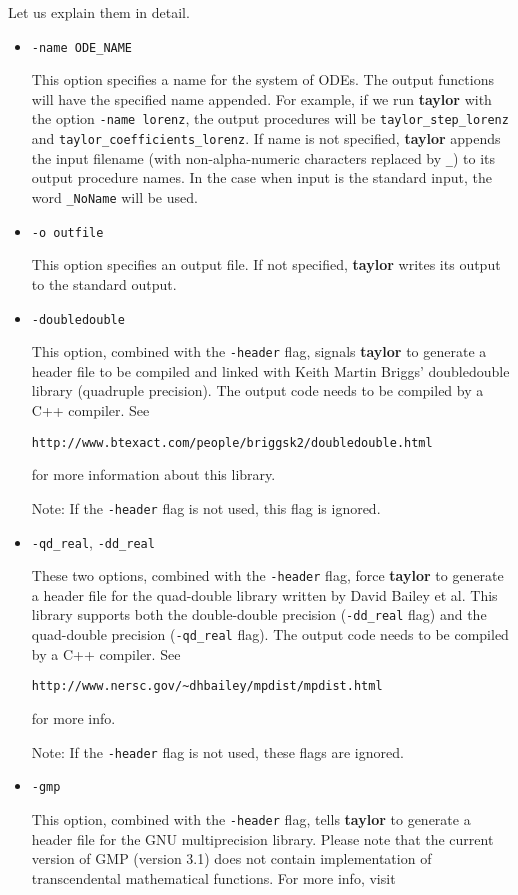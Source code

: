 \documentclass{article}
\begin{document}
Let us explain them in detail.

\begin{itemize}
\item{ \verb+-name ODE_NAME+ 

This option specifies a
name for the system of ODEs. The output functions will have
the specified name appended. For example, if we run
{\bf taylor} with the option \verb+-name lorenz+, the output
procedures will be
\verb+taylor_step_lorenz+ and
\verb+taylor_coefficients_lorenz+.
If name is not specified, {\bf taylor} appends the input
filename (with non-alpha-numeric characters replaced by
\verb+_+) to its output procedure names. In the case
when input is the standard input, the word \verb+_NoName+
will be used.}
\item{ \verb+-o outfile+ 

This option specifies an output
file. If not specified, {\bf taylor} writes its output
to the standard output.}
\item{\verb+-doubledouble+

This option, combined with the {\tt -header} flag, signals {\bf
taylor} to generate a header file to be compiled and linked with Keith
Martin Briggs' doubledouble library (quadruple precision).
The output code needs to be compiled by a C++ compiler.
See

\noindent   
\verb-http://www.btexact.com/people/briggsk2/doubledouble.html-

\noindent
for more information about this library.

Note: If the {\tt -header} flag is not used, this flag is
ignored.}
\item {{\tt -qd\_real}, {\tt -dd\_real}

These two options, combined with the {\tt -header} flag, force
{\bf taylor} to generate a header file for the
quad-double library written by
David Bailey et al. This library supports
both the double-double precision ({\tt -dd\_real} flag) and the
quad-double precision ({\tt -qd\_real} flag).
The output code needs to be compiled by a C++ compiler.
See

\verb+http://www.nersc.gov/~dhbailey/mpdist/mpdist.html+

for more info.

Note: If the {\tt -header} flag is not used, these flags are
ignored.}

\item{\verb+-gmp+ 

This option, combined with the {\tt -header} flag, tells 
{\bf taylor} to generate a header file for
the GNU multiprecision library. Please note that
the current version of GMP (version 3.1) does not
contain implementation of transcendental
mathematical functions. For more info, visit

}
\end{itemize}
\end{document}

